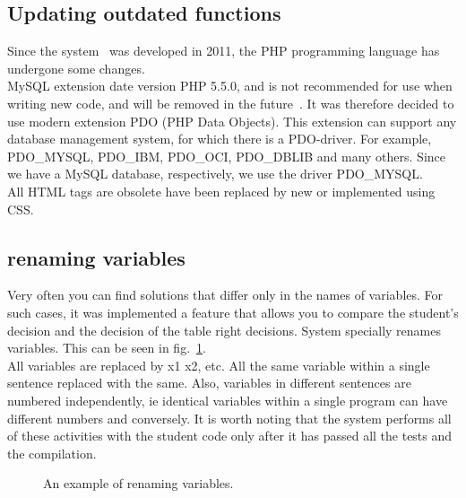 \documentclass{acmtog} %
\begin{document}
\subsection{Updating outdated functions}
Since the system~\cite{ms2855.ru} was developed in 2011, the PHP programming language has undergone some changes.\\
MySQL extension date version PHP 5.5.0, and is not recommended for use when writing new code, and will be removed in the future~\cite{php.net}. It was therefore decided to use modern extension PDO (PHP Data Objects)\cite{php.net}. This extension can support any database management system, for which there is a PDO-driver. For example, PDO\_MYSQL, PDO\_IBM, PDO\_OCI, PDO\_DBLIB and many others. Since we have a MySQL database, respectively, we use the driver PDO\_MYSQL. \\
\indent All HTML tags are obsolete have been replaced by new or implemented using CSS.

\subsection{renaming variables}
Very often you can find solutions that differ only in the names of variables. For such cases, it was implemented a feature that allows you to compare the student's decision and the decision of the table right decisions. System specially renames variables. This can be seen in fig.~\ref{renamevar}. \\
All variables are replaced by x1 x2, etc.
All the same variable within a single sentence replaced with the same. Also, variables in different sentences are numbered independently, ie identical variables within a single program can have different numbers and conversely.
It is worth noting that the system performs all of these activities with the student code only after it has passed all the tests and the compilation.
\begin{figure}[h]
\caption{An example of renaming variables.}
\label{renamevar}
\end{figure}
\end{document}
